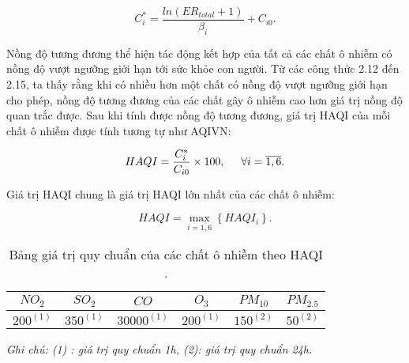 \documentclass[14pt]{extreport}
\theoremstyle{definition}
\theoremstyle{plain}
\theoremstyle{remark}
\begin{document}
\begin{equation}
C_i^* = \dfrac{ln(ER_{total} + 1)}{\beta_i} + C_{i0}.
\end{equation}

Nồng độ tương đương thể hiện tác động kết hợp của tất cả các chất ô nhiễm có nồng độ vượt ngưỡng giới hạn tới sức khỏe con người. Từ các công thức 2.12 đến 2.15, ta thấy rằng khi có nhiều hơn một chất có nồng độ vượt ngưỡng giới hạn cho phép, nồng độ tương đương của các chất gây ô nhiễm cao hơn giá trị nồng độ quan trắc được. Sau khi tính được nồng độ tương đương, giá trị HAQI của mỗi chất ô nhiễm được tính tương tự như AQIVN:

\begin{equation}
HAQI = \dfrac{C_i^*}{C_{i0}}\times 100,\hspace{0.5cm} \forall i=\overline{1,6}.
\end{equation}

Giá trị HAQI chung là giá trị HAQI lớn nhất của các chất ô nhiễm: 

\begin{equation}
HAQI = \max_{i=\overline{1,6}}\left\lbrace HAQI_i \right\rbrace.
\end{equation}

\begin{table}
\begin{tabular}{|c|c|c|c|c|c|} 
 \hline
 \hspace{0.6cm}$NO_2$ \hspace{0.6cm} & \hspace{0.65cm}$SO_2$\hspace{0.65cm} & \hspace{0.7cm}$CO$\hspace{0.7cm} & \hspace{0.7cm}$O_3$\hspace{0.7cm} & \hspace{0.55cm}$PM_{10}$\hspace{0.55cm} & \hspace{0.55cm}$PM_{2.5}$\hspace*{0.55cm}\\
 \hline \hline
 $200^{(1)}$	&	$350^{(1)}$		&	$30000^{(1)}$	&	$200^{(1)}$		&	$150^{(2)}$		&	$50^{(2)}$\\
 \hline
\end{tabular}
\caption{Bảng giá trị quy chuẩn của các chất ô nhiễm  theo HAQI \cite{TCMT2011}.}
\textit{\small{Ghi chú: (1) : giá trị quy chuẩn 1h, (2): giá trị quy chuẩn 24h.}}
\end{table}
\end{document}

